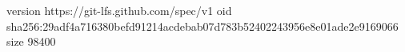 version https://git-lfs.github.com/spec/v1
oid sha256:29adf4a716380befd91214acdebab07d783b52402243956e8e01ade2e9169066
size 98400

